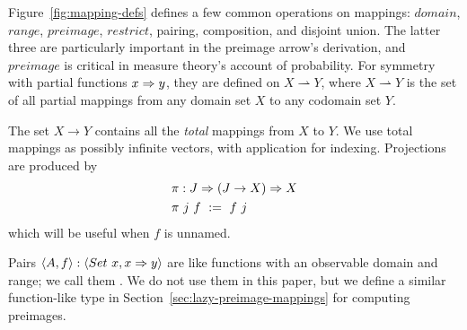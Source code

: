 \documentclass[preprint]{sigplanconf}
\newcommand{\pto}{\rightharpoonup}
\begin{document}
Figure~\ref{fig:mapping-defs} defines a few common operations on mappings: $domain$, $range$, $preimage$, $restrict$, pairing, composition, and disjoint union.
The latter three are particularly important in the preimage arrow's derivation, and $preimage$ is critical in measure theory's account of probability.
For symmetry with partial functions $x \Rightarrow y$, they are defined on $X \pto Y$, where $X \pto Y$ is the set of all partial mappings from any domain set $X$ to any codomain set $Y$.

The set $X \to Y$ contains all the \emph{total} mappings from $X$ to $Y$.
We use total mappings as possibly infinite vectors, with application for indexing.
Projections are produced by
\begin{equation}
\begin{aligned}
	&\pi : J \Rightarrow (J \to X) \Rightarrow X \\
	&\pi~j~f \ := \ f~j
\end{aligned}
\end{equation}
which will be useful when $f$ is unnamed.

Pairs $\langle{A,f}\rangle : \langle{Set~x,x \Rightarrow y}\rangle$ are like functions with an observable domain and range; we call them .
We do not use them in this paper, but we define a similar function-like type in Section~\ref{sec:lazy-preimage-mappings} for computing preimages.
\end{document}
